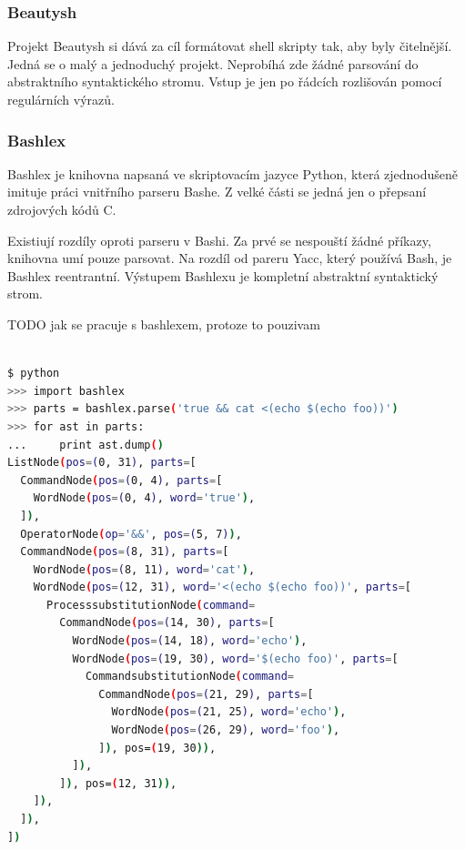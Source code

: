 \documentclass[thesis=M,czech]{FITthesis}[2012/06/26]
\begin{document}
%
\subsubsection{Beautysh}

Projekt Beautysh si dává za cíl formátovat shell skripty tak, aby byly čitelnější. Jedná se o malý a jednoduchý projekt. Neprobíhá zde žádné parsování do abstraktního syntaktického stromu. Vstup je jen po řádcích rozlišován pomocí regulárních výrazů.






%
%
%
\subsubsection{Bashlex}

Bashlex je knihovna napsaná ve skriptovacím jazyce Python, která zjednodušeně imituje práci vnitřního parseru Bashe. Z velké části se jedná jen o přepsaní zdrojových kódů C.

Existiují rozdíly oproti parseru v Bashi. Za prvé se nespouští žádné příkazy, knihovna umí pouze parsovat. Na rozdíl od pareru Yacc, který používá Bash, je Bashlex reentrantní. Výstupem Bashlexu je kompletní abstraktní syntaktický strom.

TODO jak se pracuje s bashlexem, protoze to pouzivam

\begin{minipage}{\linewidth}
\begin{lstlisting}[language=bash, caption={Výstup z knihovny Bashlex}, label={lst:bashlex}]

$ python
>>> import bashlex
>>> parts = bashlex.parse('true && cat <(echo $(echo foo))')
>>> for ast in parts:
...     print ast.dump()
ListNode(pos=(0, 31), parts=[
  CommandNode(pos=(0, 4), parts=[
    WordNode(pos=(0, 4), word='true'),
  ]),
  OperatorNode(op='&&', pos=(5, 7)),
  CommandNode(pos=(8, 31), parts=[
    WordNode(pos=(8, 11), word='cat'),
    WordNode(pos=(12, 31), word='<(echo $(echo foo))', parts=[
      ProcesssubstitutionNode(command=
        CommandNode(pos=(14, 30), parts=[
          WordNode(pos=(14, 18), word='echo'),
          WordNode(pos=(19, 30), word='$(echo foo)', parts=[
            CommandsubstitutionNode(command=
              CommandNode(pos=(21, 29), parts=[
                WordNode(pos=(21, 25), word='echo'),
                WordNode(pos=(26, 29), word='foo'),
              ]), pos=(19, 30)),
          ]),
        ]), pos=(12, 31)),
    ]),
  ]),
])

\end{lstlisting}
\end{minipage}
\end{document}
